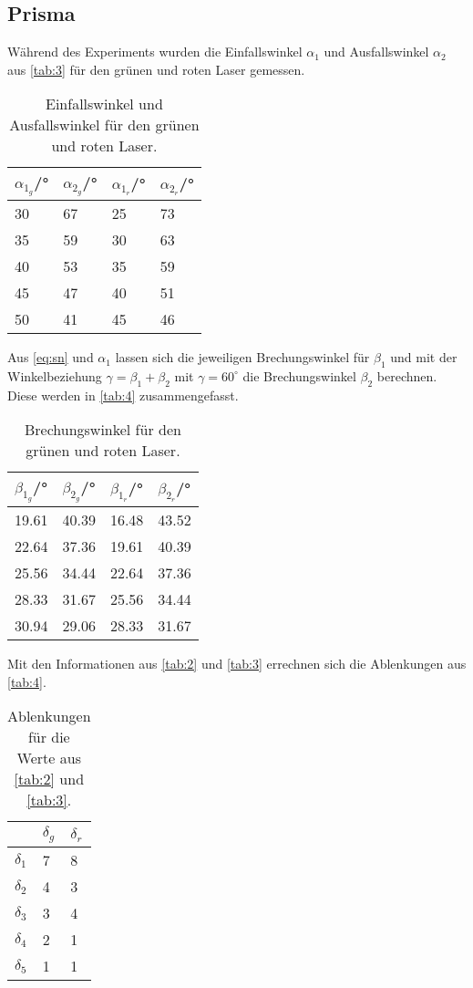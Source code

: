 \subsection{Prisma}
Während des Experiments wurden die Einfallswinkel $\alpha_1$ und Ausfallswinkel $\alpha_2$ aus \autoref{tab:3} für den grünen und roten Laser gemessen.
\begin{table}[H]
  \centering
  \caption{Einfallswinkel und Ausfallswinkel für den grünen und roten Laser.}
  \begin{tabular}{l|l|l|l}
  $\alpha_{1_g}$/° & $\alpha_{2_g}$/° & $\alpha_{1_r}$/° & $\alpha_{2_r}$/°\\\hline
  30 & 67 & 25 & 73\\
  35 & 59 & 30 & 63\\
  40 & 53 & 35 & 59\\
  45 & 47 & 40 & 51\\
  50 & 41 & 45 & 46\\\hline
  \end{tabular}
  \label{tab:3}
\end{table}
Aus \eqref{eq:sn} und $\alpha_1$ lassen sich die jeweiligen Brechungswinkel für $\beta_1$ und mit der Winkelbeziehung $\gamma=\beta_1 +\beta_2$ mit $\gamma=60^\circ$ die Brechungswinkel $\beta_2$ berechnen. Diese werden in \autoref{tab:4} zusammengefasst.
\begin{table}[H]
  \centering
  \caption{Brechungswinkel für den grünen und roten Laser.}
  \begin{tabular}{l|l|l|l}
  $\beta_{1_g}$/° & $\beta_{2_g}$/° & $\beta_{1_r}$/° & $\beta_{2_r}$/°\\\hline
  19.61 & 40.39 & 16.48 & 43.52\\
  22.64 & 37.36 & 19.61 & 40.39\\
  25.56 & 34.44 & 22.64 & 37.36\\
  28.33 & 31.67 & 25.56 & 34.44\\
  30.94 & 29.06 & 28.33 & 31.67\\\hline
  \end{tabular}
  \label{tab:3}
\end{table}
Mit den Informationen aus \autoref{tab:2} und \autoref{tab:3} errechnen sich die Ablenkungen aus \autoref{tab:4}.
\begin{table}[H]
  \centering
  \caption{Ablenkungen für die Werte aus \autoref{tab:2} und \autoref{tab:3}.}
  \begin{tabular}{l|l|l}
  & $\delta_{g}$ & $\delta_{r}$\\\hline
  $\delta_{1}$ & 7 & 8\\
  $\delta_{2}$ & 4 & 3\\
  $\delta_{3}$ & 3 & 4\\
  $\delta_{4}$ & 2 & 1\\
  $\delta_{5}$ & 1 & 1\\\hline
  \end{tabular}
  \label{tab:4}
\end{table}
